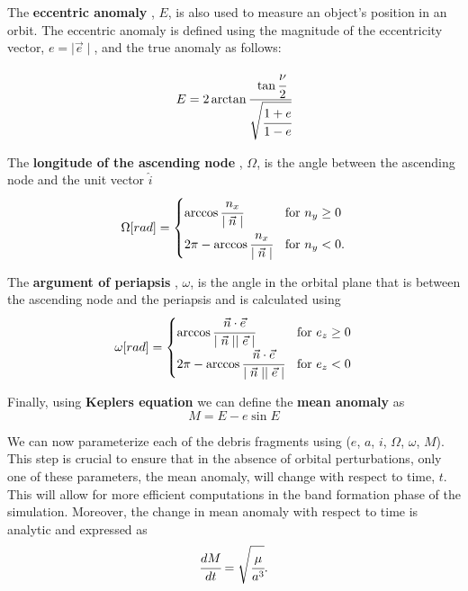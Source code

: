 \documentclass[a4paper, 12pt]{article}
\newcommand{\lindex}[1]{%
	\lowercase{\def\temp{#1}}%
	\expandafter\index\expandafter{\temp}%
}
\newcommand{\boldindex}[1]{%
	\textbf{#1}\lindex{#1}%
}
\begin{document}
 The \boldindex{eccentric anomaly}, $E$, is also used to measure an object's position in an orbit. The eccentric anomaly is defined using the magnitude of the eccentricity vector, $e = \mid\vec{e}\mid$, and  the true anomaly as follows:

\begin{equation}
	E = 2\arctan \cfrac{\tan \cfrac{\nu}{2}}{\sqrt{\cfrac{1 + e}{1-e}}}
\end{equation}

The \boldindex{longitude of the ascending node}, $\Omega$, is the angle between the ascending node and the unit vector $\hat{i}$
\begin{equation}
	\Omega [rad] = \begin{cases}
		\arccos \cfrac{n_x}{\mid \vec{n} \mid} & \text{for } n_y \geq 0 \\
		2\pi -	\arccos \cfrac{n_x}{\mid \vec{n} \mid} & \text{for } n_y < 0.
	\end{cases}
\end{equation}

The \boldindex{argument of periapsis}, $\omega$, is the angle in the orbital plane that is between the ascending node and the periapsis and is calculated using
\begin{equation}
	\omega [rad] = \begin{cases}
		\arccos \cfrac{\vec{n} \cdot \vec{e}}{\mid \vec{n} \mid \mid \vec{e} \mid} & \text{for } e_z \geq 0 \\
		2\pi -\arccos \cfrac{\vec{n} \cdot \vec{e}}{\mid \vec{n} \mid \mid \vec{e} \mid}& \text{for } e_z < 0	
	\end{cases}
\end{equation}

Finally, using \boldindex{Keplers equation} we can define the \boldindex{mean anomaly} as
\begin{equation}
	M = E - e\sin E
\end{equation}

We can now parameterize each of the debris fragments using ($e$, $a$, $i$, $\Omega$, $\omega$, $M$). This step is crucial to ensure that in the absence of orbital perturbations, only one of these parameters, the mean anomaly, will change with respect to time, $t$. This will allow for more efficient computations in the band formation phase of the simulation. Moreover, the change in mean anomaly with respect to time is analytic and expressed as
\begin{equation}
\cfrac{dM}{dt} = \sqrt{\cfrac{\mu}{a^3}}.
\end{equation}
\end{document}
